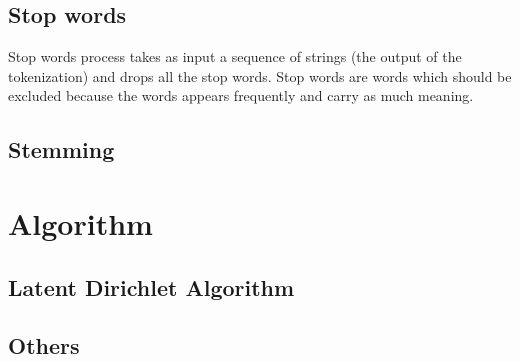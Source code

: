 \subsection{Stop words}
Stop words process takes as input a sequence of strings (\eg the output of the tokenization) and drops all the stop words.
\newline
Stop words are words which should be excluded because the words appears frequently and carry as much meaning. 

\subsection{Stemming}



\section{Algorithm}
\subsection{Latent Dirichlet Algorithm}
\subsection{Others}

